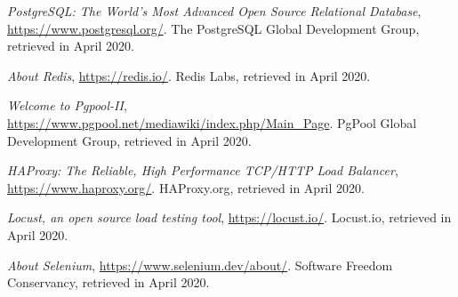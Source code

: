 \documentclass[12pt]{article}
\begin{document}
\begin{thebibliography}{9}
    \textit{PostgreSQL: The World's Most Advanced Open Source Relational Database},
    \url{https://www.postgresql.org/}.
    The PostgreSQL Global Development Group,
    retrieved in April 2020.
    \vspace{-10pt}

    \textit{About Redis},
    \url{https://redis.io/}.
    Redis Labs,
    retrieved in April 2020.
    \vspace{-10pt}

    \textit{Welcome to Pgpool-II},
    \url{https://www.pgpool.net/mediawiki/index.php/Main_Page}.
    PgPool Global Development Group,
    retrieved in April 2020.
    \vspace{-10pt}

    \textit{HAProxy: The Reliable, High Performance TCP/HTTP Load Balancer},
    \url{https://www.haproxy.org/}.
    HAProxy.org,
    retrieved in April 2020.
    \vspace{-10pt}

  

    \textit{Locust, an open source load testing tool},
    \url{https://locust.io/}.
    Locust.io,
    retrieved in April 2020.
    \vspace{-10pt}

    \textit{About Selenium},
    \url{https://www.selenium.dev/about/}.
    Software Freedom Conservancy,
    retrieved in April 2020.
    \vspace{-10pt}

\end{thebibliography}

\clearpage
\end{document}
